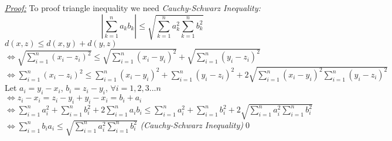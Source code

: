 \documentclass[12pt]{article}
\begin{document}
\begin{center} 
\end{center}
\textit{\underline{\color{red}Proof:}}
To proof triangle inequality we need \textit{\color{blue}Cauchy-Schwarz	Inequality:}\\
{$$\left |\sum_{k=1}^{n}a_k b_k \right |\leq \sqrt{\sum_{k=1}^{n}a_k^2 \sum_{k=1}^{n}b_k^2}$$}
$d(x,z)\leq d(x,y)+d(y,z)$\\
$\Leftrightarrow \sqrt{\sum_{i=1}^{n}(x_i-z_i)^2}\leq \sqrt{\sum_{i=1}^{n}(x_i-y_i)^2}+\sqrt{\sum_{i=1}^{n}(y_i-z_i)^2}$\\
$\Leftrightarrow \sum_{i=1}^{n}(x_i-z_i)^2\leq \sum_{i=1}^{n}(x_i-y_i)^2+\sum_{i=1}^{n}(y_i-z_i)^2+2\sqrt{\sum_{i=1}^{n}(x_i-y_i)^2\sum_{i=1}^{n}(y_i-z_i)^2}$\\
Let $a_i=y_i-x_i$,  $b_i=z_i-y_i$, $\forall i=1,2,3...n$\\
$\Leftrightarrow z_i-x_i=z_i-y_i+y_i-x_i=b_i+a_i$\\
$\Leftrightarrow \sum_{i=1}^{n}a_i^2+ \sum_{i=1}^{n}b_i^2+2\sum_{i=1}^{n}a_i b_i\leq \sum_{i=1}^{n}a_i^2+\sum_{i=1}^{n}b_i^2+2\sqrt{\sum_{i=1}^{n}a_i^2\sum_{i=1}^{n} b_i^2}$
$\Leftrightarrow \sum_{i=1}^{n}b_i a_i\leq \sqrt{\sum_{i=1}^{n}a_i^2\sum_{i=1}^{n} b_i^2}$ \textit{\color{blue}(Cauchy-Schwarz Inequality)}\qed
\newpage
\end{document}
